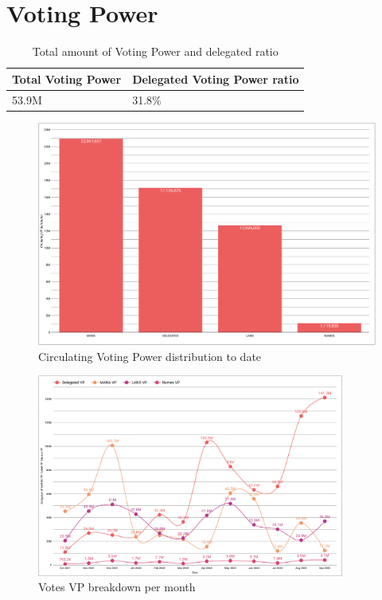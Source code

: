 \documentclass[MSE,Master,english]{twbook}%
\begin{document}
\section{Voting Power}
\begin{center}
  \begin{table}[H]
    \begin{tabular}{ | m{20em} | m{20em} | }
      \hline
      \textbf{Total Voting Power} & \textbf{Delegated Voting Power ratio} \\
      \hline
      53.9M & 31.8\% \\
      \hline
    \end{tabular}
    \caption{Total amount of Voting Power and delegated ratio}
    \label{table:VP}
  \end{table}
\end{center}
\begin{figure}[H]
  \centering
  \includegraphics[width=\textwidth]{metrics/vp_distribution.png}
  \caption{Circulating Voting Power distribution to date}
  \label{fig:vp_distribution}
\end{figure}
\begin{figure}[H]
  \centering
  \includegraphics[width=0.9\textwidth]{metrics/votes_breakdown.png}
  \caption{Votes VP breakdown per month}
  \label{fig:votes_vp}
\end{figure}
\end{document}
